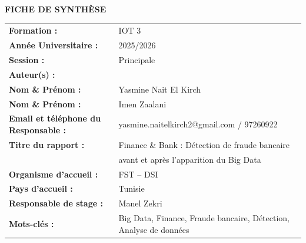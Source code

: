 \documentclass[12pt,a4paper]{article}
\begin{document}
\vspace*{1cm}  %
\begin{center}
    {\LARGE \textbf{FICHE DE SYNTHÈSE}}\\[0.5cm]
\end{center}

\begin{tabular}{>{\bfseries}p{6cm} p{9cm}}
Formation : & IOT 3 \\
Année Universitaire : & 2025/2026 \\
Session : & Principale \\
Auteur(s) : & \\
\quad Nom \& Prénom : & Yasmine Nait El Kirch \\
\quad Nom \& Prénom : & Imen Zaalani \\
Email et téléphone du Responsable : & yasmine.naitelkirch2@gmail.com / 97260922 \\
Titre du rapport : & Finance \& Bank : Détection de fraude bancaire\\
& avant et après l’apparition du Big Data \\
Organisme d’accueil : & FST – DSI \\
Pays d’accueil : & Tunisie \\
Responsable de stage : & Manel Zekri \\
Mots-clés : & Big Data, Finance, Fraude bancaire, Détection, Analyse de données \\
\end{tabular}
\end{document}
